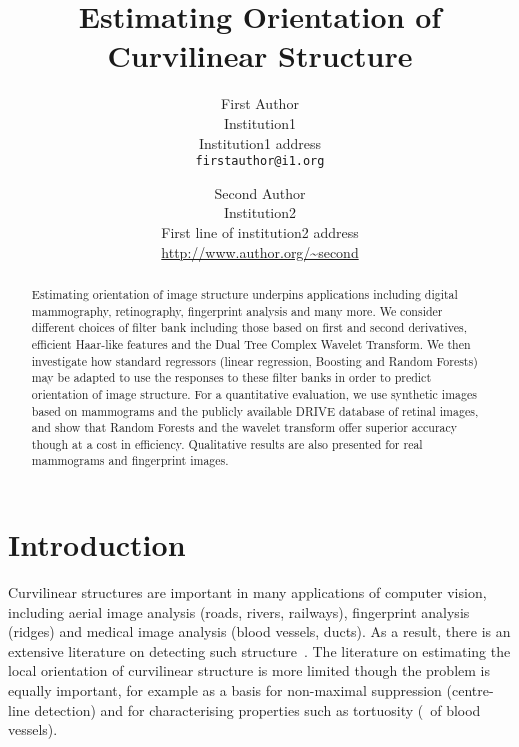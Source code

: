 \documentclass[10pt,twocolumn,letterpaper]{article}
\newcommand{\comment}[1]{}
\begin{document}
\def\ttl{Estimating Orientation of Curvilinear Structure}
\title{\ttl}

\author{First Author\\
Institution1\\
Institution1 address\\
{\tt\small firstauthor@i1.org}
\and
Second Author\\
Institution2\\
First line of institution2 address\\
{\small\url{http://www.author.org/~second}}
}

\maketitle

\begin{abstract}
Estimating orientation of image structure underpins applications including digital mammography, retinography, fingerprint analysis and many more. We consider different choices of filter bank including those based on first and second derivatives, efficient Haar-like features and the Dual Tree Complex Wavelet Transform. We then investigate how standard regressors (linear regression, Boosting and Random Forests) may be adapted to use the responses to these filter banks in order to predict orientation of image structure. For a quantitative evaluation, we use synthetic images based on mammograms and the publicly available DRIVE database of retinal images, and show that Random Forests and the wavelet transform offer superior accuracy though at a cost in efficiency. Qualitative results are also presented for real mammograms and fingerprint images.\end{abstract}

\def\figpath{./figs}

\section{Introduction}
\label{s:introduction}
Curvilinear structures are important in many applications of computer vision, including aerial image analysis (roads, rivers, railways), fingerprint analysis (ridges) and medical image analysis (blood vessels, ducts). As a result, there is an extensive literature on detecting such structure~\cite{Papari_Petkov_IVC11}. The literature on estimating the local orientation of curvilinear structure is more limited though the problem is equally important, for example as a basis for non-maximal suppression (centre-line detection) and for characterising properties such as tortuosity (\eg~of blood vessels).
\comment{Give some examples of estimating line orientation}
\end{document}
